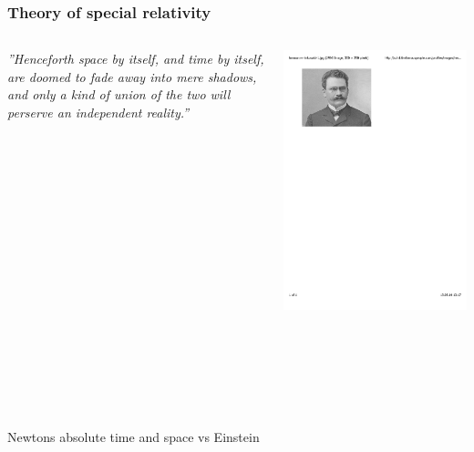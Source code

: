 \documentclass[mathserif,10pt]{beamer}
\begin{document}
\begin{frame}
    \frametitle{Theory of special relativity}
    \begin{columns}
    \begin{column}{.60\textwidth}
	\centering
	\begin{exampleblock}{\it{\small{''Henceforth space by itself, and time by itself,
	    are doomed to fade away into mere shadows, and only a kind of union of the
	    two will perserve an independent reality.''}}}
	    \vskip2mm
	    \hspace*{}
	\end{exampleblock}
    \end{column}
    \begin{column}{.40\textwidth}
	\centering
	\includegraphics[viewport = 70 600 270 780, clip, scale=0.4]{figures/minkowski.pdf}
    \end{column}
    \end{columns}
    \ \\
    \ \\
    \ \\
    \ \\
    \ \\
    Newtons absolute time and space vs Einstein
\end{frame}
\end{document}
